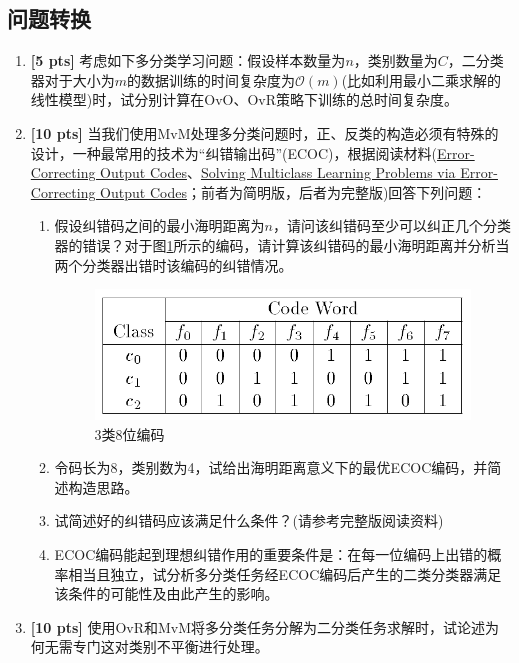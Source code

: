 \documentclass[a4paper,UTF8]{article}
\numberwithin{equation}{section}
\begin{document}
\subsection{问题转换}
\begin{enumerate}[(1)]
	\item \textbf{[5 pts]} 考虑如下多分类学习问题：假设样本数量为$n$，类别数量为$C$，二分类器对于大小为$m$的数据训练的时间复杂度为$ \mathcal{O}(m) $(比如利用最小二乘求解的线性模型)时，试分别计算在OvO、OvR策略下训练的总时间复杂度。
	\item \textbf{[10 pts]} 当我们使用MvM处理多分类问题时，正、反类的构造必须有特殊的设计，一种最常用的技术为“纠错输出码”(ECOC)，根据阅读材料(\href{ccs.neu.edu/home/vip/teach/MLcourse/4_boosting/lecture_notes/ecoc/ecoc.pdf}{Error-Correcting Output Codes}、\href{https://arxiv.org/pdf/cs/9501101.pdf}{Solving Multiclass Learning Problems via Error-Correcting Output Codes}\cite{dietterich1994solving}；前者为简明版，后者为完整版)回答下列问题：
	\begin{enumerate}[1)]
		\item 假设纠错码之间的最小海明距离为$n$，请问该纠错码至少可以纠正几个分类器的错误？对于图\ref{img}所示的编码，请计算该纠错码的最小海明距离并分析当两个分类器出错时该编码的纠错情况。
		\begin{figure}[htbp]
			\centering
			\includegraphics[width=.8\textwidth]{figure/codeword.png} %
			\caption{3类8位编码} %
			\label{img} %
		\end{figure}
		\item 令码长为8，类别数为4，试给出海明距离意义下的最优ECOC编码，并简述构造思路。
		\item 试简述好的纠错码应该满足什么条件？(请参考完整版阅读资料)
		\item ECOC编码能起到理想纠错作用的重要条件是：在每一位编码上出错的概率相当且独立，试分析多分类任务经ECOC编码后产生的二类分类器满足该条件的可能性及由此产生的影响。
	\end{enumerate}	
	\item \textbf{[10 pts]} 使用OvR和MvM将多分类任务分解为二分类任务求解时，试论述为何无需专门这对类别不平衡进行处理。
\end{enumerate}
\end{document}
